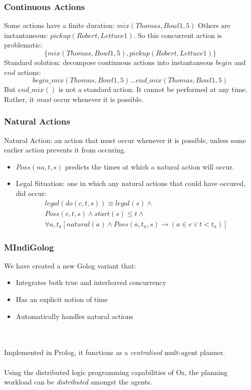 \documentclass{beamer}
\begin{document}
\begin{frame}
\frametitle{Continuous Actions}
Some actions have a finite duration: $mix(Thomas,Bowl1,5)$
Others are instantaneous: $pickup(Robert,Lettuce1)$.
So this concurrent action is problematic:\[
\{mix(Thomas,Bowl1,5),pickup(Robert,Lettuce1)\}\]
Standard solution: decompose continuous actions into instantaneous $begin$
and $end$ actions:\[
begin\_mix(Thomas,Bowl1,5) \dots end\_mix(Thomas,Bowl1,5)\]
But $end\_mix()$ is not a standard action.  It cannot be performed at
any time.  Rather, it \emph{must} occur whenever it is possible.
\end{frame}

\begin{frame}
\frametitle{Natural Actions}
Natural Action:  an action that must occur whenever it is possible,
unless some earlier action prevents it from occuring.
\begin{itemize}
  \item $Poss(na,t,s)$ predicts the times at which a natural action will occur.
  \item Legal Situation: one in which any natural actions that could have occured, did occur:\[
\begin{array}{c}
legal(do(c,t,s)) \equiv legal(s) \wedge\\
Poss(c,t,s) \wedge start(s) \leq t \wedge\\
\forall a,t_a [natural(a) \wedge Poss(a,t_a,s) \rightarrow (a \in c \vee t < t_a)]
\end{array}\]
\end{itemize}
\end{frame}

\begin{frame}
\frametitle{MIndiGolog}
We have created a new Golog variant that:
\begin{itemize}
  \item Integrates both true and interleaved concurrency
  \item Has an explicit notion of time
  \item Automatically handles natural actions
\end{itemize}
\ \\
\ \\
Implemented in Prolog, it functions as a \emph{centralised} mult-agent planner.
\ \\
\ \\
Using the distributed logic programming capabilities of Oz, the planning
workload can be \emph{distributed} amongst the agents.
\end{frame}
\end{document}
